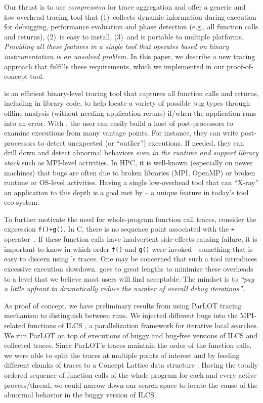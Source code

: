 %
Our thrust is to use \textit{compression} for trace aggregation and offer 
a generic and low-overhead tracing tool that 
(1)~collects dynamic information during execution for debugging, performance evaluation and phase detection (e.g., all function
calls and returns), 
(2)~is easy to install, 
(3)~and is portable to multiple platforms.
%
{\em Providing all these features in a single tool
that operates based on binary instrumentation
is an unsolved problem.}
%
In this paper, we describe a new tracing approach that fulfills these requirements, which we implemented in our proof-of-concept \parlot tool.


\parlot is an efficient binary-level tracing tool that captures all function calls and returns, including in library code, 
to help locate a variety of possible bug types through 
offline analysis (without needing application reruns) 
if/when the application runs into an error. 
%
With \parlot, the user can easily build a host of post-processors to examine
executions from many vantage points.
%
For instance, they can write post-processors
to detect unexpected (or ``outlier'') executions.
%
If needed, they can 
drill down and detect abnormal behaviors {\em even in the runtime and
support library stack} such as MPI-level activities.
%
In HPC, it is well-known (especially on newer machines) that bugs are often due to
broken libraries (MPI, OpenMP) or broken runtime or OS-level activities.
%
Having a single low-overhead tool that can ``X-ray'' an application to this depth is a goal met by \parlot -- a unique feature in today's tool eco-system.

To further motivate the need for whole-program function call
traces, consider the expression {\tt f()+g()}.
%
In C, there is no sequence point associated with the {\tt +}
operator~\cite{sequence-points-in-C}.
%
If these function calls have inadvertent side-effects causing 
failure, it is important to know in which order {\tt f()}
and {\tt g()} were invoked---something that is easy to discern using
\parlot 's traces.
%
One may be concerned that such a tool introduces excessive execution slowdown.
%
\parlot goes to great lengths to minimize these overheads to a level that we believe most users will find acceptable. The mindset is to \textit{``pay a little upfront to dramatically reduce the number of overall debug iterations''}. 

%
As proof of concept, we have preliminary results from using ParLOT tracing mechanism to distinguish between runs.
%
We injected different bugs into the MPI-related functions of ILCS \cite{ilcs} , a parallelization framework for iterative local searches.
%
We run ParLOT on top of executions of buggy and bug-free versions of ILCS and collected traces.
%
Since ParLOT's traces maintain the order of the function calls, we were able to split the traces at multiple points of interest and by feeding different chunks of traces to a Concept Lattice data structure \cite{clbook} \cite{clconst}. 
%
Having the totally ordered sequence of function calls of the whole program for each and every active process/thread, we could narrow down our search space to locate the cause of the abnormal behavior in the buggy version of ILCS. 

